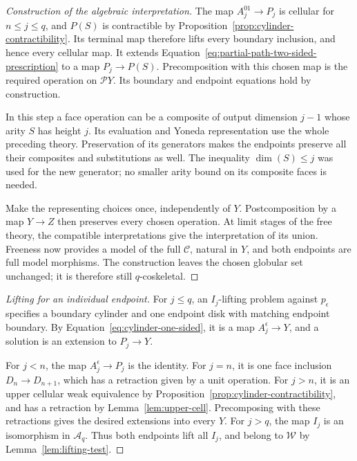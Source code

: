 \begin{proof}[Construction of the algebraic interpretation]
The map \(A_j^{01}\to P_j\) is cellular for
\(n\le j\le q\), and \(P(S)\) is contractible by
Proposition~\ref{prop:cylinder-contractibility}.  Its terminal map
therefore lifts every boundary inclusion, and hence every cellular map.
It extends Equation~\eqref{eq:partial-path-two-sided-prescription} to
a map \(P_j\to P(S)\).  Precomposition with this chosen map is
the required operation on \(\mathcal P Y\).  Its boundary and
endpoint equations hold by construction.

In this step a face operation can be a composite of output dimension
\(j-1\) whose arity \(S\) has height \(j\).  Its evaluation
and Yoneda representation use the whole preceding theory.  Preservation
of its generators makes the endpoints preserve all their composites
and substitutions as well.  The inequality \(\dim(S)\le j\)
was used for the new generator; no smaller arity bound on its composite
faces is needed.

Make the representing choices once, independently of \(Y\).
Postcomposition by a map \(Y\to Z\) then preserves every
chosen operation.  At limit stages of the free theory, the compatible
interpretations give the interpretation of its union.  Freeness now
provides a model of the full \(\mathcal C\), natural in \(Y\),
and both endpoints are full model morphisms.  The construction leaves
the chosen globular set unchanged; it is therefore still
\(q\)-coskeletal.
\end{proof}

\begin{proof}[Lifting for an individual endpoint]
For \(j\le q\), an \(I_j\)-lifting problem against
\(p_\epsilon\) specifies a boundary cylinder and one endpoint
disk with matching endpoint boundary.  By
Equation~\eqref{eq:cylinder-one-sided}, it is a map
\(A_j^\epsilon\to Y\), and a solution is an extension to
\(P_j\to Y\).

For \(j<n\), the map \(A_j^\epsilon\to P_j\) is the
identity.  For \(j=n\), it is one face inclusion
\(D_n\to D_{n+1}\), which has a retraction given by a unit
operation.  For \(j>n\), it is an upper cellular weak equivalence
by Proposition~\ref{prop:cylinder-contractibility}, and has a
retraction by Lemma~\ref{lem:upper-cell}.  Precomposing with these
retractions gives the desired extensions into every \(Y\).
For \(j>q\), the map \(I_j\) is an isomorphism in
\(\mathcal A_q\).  Thus both endpoints lift all \(I_j\),
and belong to \(\mathcal W\) by Lemma~\ref{lem:lifting-test}.
\end{proof}


